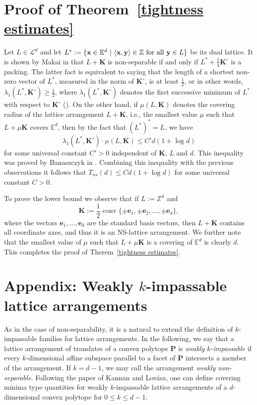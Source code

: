 \documentclass[12pt]{article}
\DeclareMathOperator{\conv}{conv}
\newcommand{\KK}{\mathbf K}
\newcommand{\Ee}{{\mathbb E}}
\newcommand{\e}{\mathbf{e}}
\begin{document}
\section{Proof of Theorem~\ref{tightness estimates}}

Let $L\in\mathcal{L}^d$ and let $L^*:=\{\mathbf{x}\in\Ee^d\ |\ \langle\mathbf{x},\mathbf{y}\rangle\in\mathbb{Z}\ {\rm for\ all}\ \mathbf{y}\in L\}$ be its dual lattice.
It is shown by Makai in \cite{Ma78} that $L + \KK$ is non-separable if and only if $L^* + \frac{1}{4} \KK^{\circ}$ is a packing. The latter fact is equivalent to saying that the length of a shortest non-zero vector of $L^*$, measured in the norm of $\KK^{\circ}$, is at least $\frac{1}{2}$, or in other words, $\lambda_1(L^*, \KK^{\circ}) \geq \frac{1}{2}$, where $\lambda_1(L^*, \KK^{\circ})$ denotes the first successive minimum of $L^*$ with respect to $\KK^{\circ}$ (\cite{Banaszczyk2}). On the other hand, if $\mu(L, \KK)$ denotes the covering radius of the lattice arrangement $L + \KK$, i.e., the smallest value $\mu$ such that $L + \mu \KK$ covers $\Ee^d$, then by the fact that $(L^*)^*=L$, we have
\[
\lambda_1(L^*, \KK^{\circ}) \cdot \mu(L, \KK) \leq C'd(1+\log d)
\]
for some universal constant $C'>0$ independent of $\KK$, $L$ and $d$.
This inequality was proved by Banaszczyk in \cite[Corollary 1]{Banaszczyk2}. Combining this inequality with the previous observations it follows that $T_{ns}(d) \leq C d(1+\log d)$ for some universal constant $C >0$.

To prove the lower bound we observe that if $L:= \mathbb{Z}^d$ and $$\KK := \frac{1}{2} \conv \{ \pm \e_1, \pm \e_2, \ldots, \pm \e_d \},$$ where the vectors $\e_1, \ldots, \e_d$ are the standard basis vectors, then $L+ \KK$ contains all coordinate axes, and thus it is an NS-lattice arrangement. We further note that the smallest value of $\mu$ such that $L + \mu \KK$ is a covering of $\Ee^d$ is clearly $d$. This completes the proof of Therem~\ref{tightness estimates}.


\section{Appendix: Weakly $k$-impassable lattice arrangements}

As in the case of non-separability, it is a natural to extend the definition of $k$-impassable families for lattice arrangements. In the following, we say that a lattice arrangement of translates of a convex polytope $\mathbf{P}$ is \emph{weakly $k$-impassable} if every $k$-dimensional affine subspace parallel to a facet of $\mathbf{P}$ intersects a member of the arrangement. If $k=d-1$, we may call the arrangement \emph{weakly non-separable}.
Following the paper \cite{KaLo} of Kannan and Lov\'asz, one can define covering minima type quantities for weakly $k$-impassable lattice arrangements of a $d$-dimensional convex polytope for $0\leq k\leq d-1$.
\end{document}
